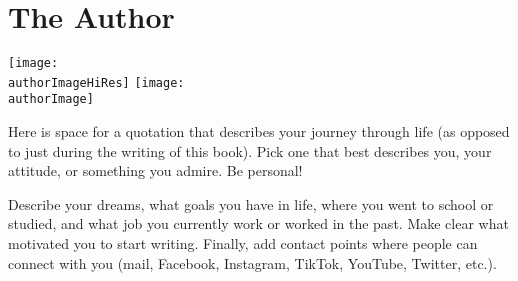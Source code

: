 


\chapter{The Author \yourName}
\label{the-author:cha}

\begin{center}

\ifuseAuthorImage
\ifxetex
	\texttt{[image: \\authorImageHiRes]}
\else
	\texttt{[image: \\authorImage]}
\fi
\fi

\end{center}

\begin{myquotation} Here is space for a quotation that describes your journey through life (as opposed to just during the writing of this book). Pick one that best describes you, your attitude, or something you admire. Be personal!\end{myquotation}


Describe your dreams, what goals you have in life, where you went to school or studied, and what job you currently work or worked in the past. Make clear what motivated you to start writing. Finally, add contact points where people can connect with you (mail, Facebook, Instagram, TikTok, YouTube, Twitter, etc.).
